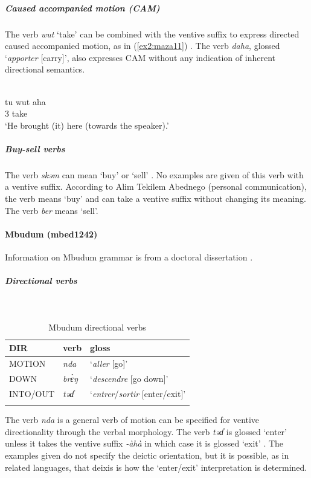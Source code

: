\subparagraph{Caused accompanied motion (CAM)}

The verb \textit{wut} ‘take’ can be combined with the ventive suffix to express directed caused accompanied motion, as in (\ref{ex2:maza11}) \citep[cf.][170]{mouchetParlerDabaEsquisse1966}. The verb \textit{daha}, glossed `\textit{apporter} [carry]', also expresses CAM without any indication of inherent directional semantics.

\ea\label{ex2:maza11}
 \\
\gll tu	wut	aha \\
3	take	 \\	
\glt `He brought (it) here (towards the speaker).'
\z 

\subparagraph{Buy-sell verbs}

The verb \textit{skəm} can mean `buy' or `sell' \citep[150]{mouchetParlerDabaEsquisse1966}. No examples are given of this verb with a ventive suffix. According to Alim Tekilem Abednego (personal communication), the verb means `buy' and can take a ventive suffix without changing its meaning. The verb \textit{ber} means `sell'.

\paragraph*{Mbudum (mbed1242)} \label{mbud}

Information on Mbudum grammar is from a doctoral dissertation \citep[]{fobakayyangPhonologieMorphologieSyntaxe2021}.

\subparagraph{Directional verbs}~

\begin{table}[H]
\caption{Mbudum directional verbs} 
\label{tab:mbudV}
\begin{tabular}{lll} %
	\lsptoprule
	DIR & verb & gloss   \\ %
	\midrule
	MOTION & \textit{nda} & `\textit{aller} [go]' \\
	DOWN &  \textit{brɛ̀ŋ} & `\textit{descendre} [go down]' \\
	INTO/OUT & \textit{təɗ} & `\textit{entrer}/\textit{sortir} [enter/exit]' \\
	\lspbottomrule
\end{tabular}
\end{table}

The verb \textit{nda} is a general verb of motion can be specified for ventive directionality through the verbal morphology. The verb \textit{təɗ} is glossed `enter' unless it takes the ventive suffix \textit{-àhà} in which case it is glossed `exit' \citep[290]{fobakayyangPhonologieMorphologieSyntaxe2021}. The examples given do not specify the deictic orientation, but it is possible, as in related languages, that deixis is how the `enter/exit' interpretation is determined. 

